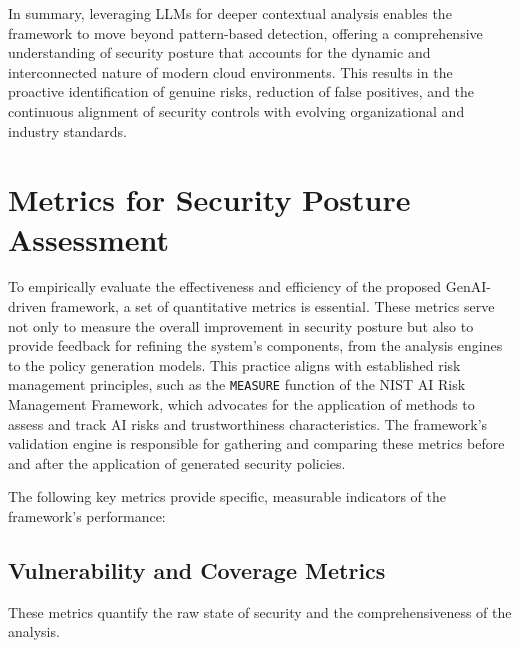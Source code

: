 In summary, leveraging LLMs for deeper contextual analysis enables the framework to move beyond pattern-based detection, offering a comprehensive understanding of security posture that accounts for the dynamic and interconnected nature of modern cloud environments\cite{li_iris_2025, andrade_enhancing_2025-1}. This results in the proactive identification of genuine risks, reduction of false positives, and the continuous alignment of security controls with evolving organizational and industry standards.


\section{Metrics for Security Posture Assessment} %
\label{sec:Metrics for Security Posture Assessment}

To empirically evaluate the effectiveness and efficiency of the proposed GenAI-driven framework, a set of quantitative metrics is essential. These metrics serve not only to measure the overall improvement in security posture but also to provide feedback for refining the system's components, from the analysis engines to the policy generation models. This practice aligns with established risk management principles, such as the \texttt{MEASURE} function of the NIST AI Risk Management Framework, which advocates for the application of methods to assess and track AI risks and trustworthiness characteristics. The framework's validation engine is responsible for gathering and comparing these metrics before and after the application of generated security policies.

The following key metrics provide specific, measurable indicators of the framework's performance:

\subsection*{Vulnerability and Coverage Metrics}
These metrics quantify the raw state of security and the comprehensiveness of the analysis.

